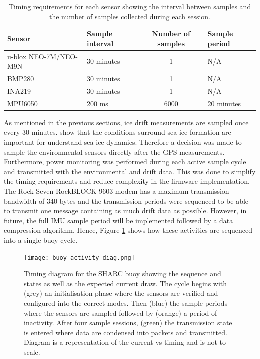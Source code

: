 \begin{table}[H]
	\centering
	\caption{Timing requirements for each sensor showing the interval between samples and the number of samples collected during each session.}
	\label{tab:sensor_timing}
	\setlength{\extrarowheight}{5pt}
	
	\begin{tabular}{llcl}
		\hline
		\textbf{Sensor}& \textbf{Sample interval} & \textbf{Number of samples} & \textbf{Sample period}\\
		\hline
		\hline
		u-blox NEO-7M/NEO-M9N & 30 minutes & 1 & N/A\\
		\hline
		BMP280 & 30 minutes & 1 & N/A\\
		\hline
		INA219 & 30 minutes & 1 & N/A \\
		\hline
		MPU6050 & 200 ms & 6000 &  20 minutes\\
		\hline
		\hline
	\end{tabular}
\end{table}
As mentioned in the previous sections, ice drift measurements are sampled once every 30 minutes. \textcite{vichi2019effects,alberello2019drift} show that the conditions surround sea ice formation are important for understand sea ice dynamics. Therefore a decision was made to sample the environmental sensors directly after the GPS measurements. Furthermore, power monitoring was performed during each active sample cycle and transmitted with the environmental and drift data. This was done to simplify the timing requirements and reduce complexity in the firmware implementation. The Rock Seven RockBLOCK 9603 modem has a maximum transmission bandwidth of 340 bytes and the transmission periods were sequenced to be able to transmit one message containing as much drift data as possible. However, in future, the full IMU sample period will be implemented followed by a data compression algorithm. Hence, Figure \ref{fig:buoyactivity diagram} shows how these activities are sequenced into a single buoy cycle.

\begin{figure}[H]
	\centering
	\texttt{[image: buoy activity diag.png]}
	\caption{Timing diagram for the SHARC buoy showing the sequence and states as well as the expected current draw. The cycle begins with (grey) an initialisation phase where the sensors are verified and configured into the correct modes. Then (blue) the sample periods where the sensors are sampled followed by (orange) a period of inactivity. After four sample sessions, (green) the transmission state is entered where data are  condensed into packets and transmitted. Diagram is a representation of the current vs timing and is not to scale. }
	\label{fig:buoyactivity diagram}
\end{figure}

